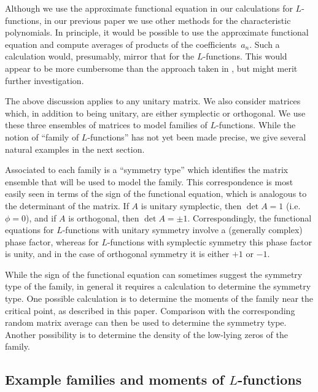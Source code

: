 \documentclass[12pt,letterpaper]{amsart}
\theoremstyle{plain}
\theoremstyle{definition}
\theoremstyle{remark}
\numberwithin{equation}{subsection}
\numberwithin{theorem}{subsection}
\numberwithin{table}{subsection}
\begin{document}
Although we use the approximate functional equation in our
calculations for $L$-functions,
in our previous paper \cite{CFKRS}
we use other methods for the characteristic polynomials.
In principle,
it would be possible to use
the approximate functional equation and compute
averages of products of the coefficients~$a_n$.
Such a calculation would, presumably, mirror that for
the $L$-functions.
This would appear to be more cumbersome than the
approach taken in \cite{CFKRS}, but might merit further investigation.

The above discussion applies to any unitary matrix.  We also
consider matrices which, in addition to being unitary, are either
symplectic or orthogonal. We use these three ensembles of matrices
to model families of $L$-functions.  While the notion of ``family
of $L$-functions''  has not yet been made precise, we give several
natural examples in the next section.

Associated to each family is a ``symmetry type'' which identifies
the matrix ensemble that will be used to model the family. This
correspondence is most easily seen in terms of the sign of the
functional equation, which is analogous to the determinant of the
matrix. If $A$ is unitary symplectic, then $\det A=1$ (i.e.
$\phi=0$), and if $A$ is orthogonal, then $\det A=\pm 1$.
Correspondingly, the functional equations for $L$-functions with
unitary symmetry involve a (generally complex) phase factor,
whereas for $L$-functions with symplectic symmetry this phase
factor is unity, and in the case of orthogonal symmetry it is
either $+1$ or $-1$.

While the sign of the functional equation can sometimes 
suggest the symmetry type of the family, in general it requires
a calculation to determine the symmetry type.  One possible
calculation is to determine
the moments of the family near the critical point,
as described in this paper.
Comparison with the corresponding
random matrix average can then be used to determine the symmetry type.
Another possibility is to determine the density
of the low-lying zeros of the family.


\subsection{  Example families and moments of $L$-functions
}\label{sec:examplefamilies}
\end{document}
